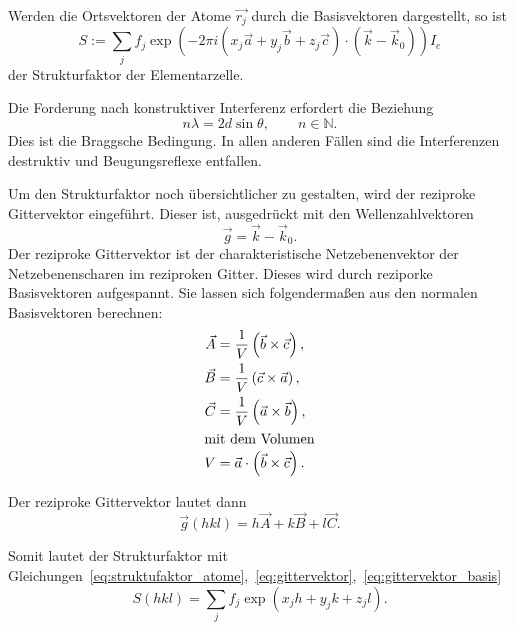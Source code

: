 Werden die Ortsvektoren der Atome $\vec{r_j}$ durch die Basisvektoren dargestellt, so ist
\begin{equation}
  \label{eq:struktufaktor_atome}
  S := \sum_j f_j \exp\left(-2\pi i \left(x_j \vec{a} + y_j \vec{b} + z_j \vec{c}\right) \cdot \left(\vec{k} - \vec{k}_0 \right)\right) I_e
\end{equation}
der Strukturfaktor der Elementarzelle.

Die Forderung nach konstruktiver Interferenz erfordert die Beziehung
\begin{equation}
  n \lambda = 2 d \sin{\theta}, \hspace{2em} n \in \mathbb{N}.
\end{equation}
Dies ist die Braggsche Bedingung.
In allen anderen Fällen sind die Interferenzen destruktiv und Beugungsreflexe entfallen.

Um den Strukturfaktor noch übersichtlicher zu gestalten, wird der reziproke Gittervektor eingeführt.
Dieser ist, ausgedrückt mit den Wellenzahlvektoren
\begin{equation}
  \label{eq:gittervektor}
  \vec{g} = \vec{k} - \vec{k}_0.
\end{equation}
Der reziproke Gittervektor ist der charakteristische Netzebenenvektor der Netzebenenscharen im reziproken Gitter.
Dieses wird durch reziporke Basisvektoren aufgespannt.
Sie lassen sich folgendermaßen aus den normalen Basisvektoren berechnen:
\begin{align}
  \label{eq:reziproke_basisvektoren}
  \vec{A} &= \frac{1}{V} \left(\vec{b} \times \vec{c}\right), \\
  \vec{B} &= \frac{1}{V} \left(\vec{c} \times \vec{a}\right), \\
  \vec{C} &= \frac{1}{V} \left(\vec{a} \times \vec{b}\right), \\
  \intertext{mit dem Volumen}
  V &= \vec{a} \cdot \left(\vec{b} \times \vec{c}\right).
\end{align}

Der reziproke Gittervektor lautet dann
\begin{equation}
  \label{eq:gittervektor_basis}
  \vec{g}(hkl) = h\vec{A} + k\vec{B} + l\vec{C}.
\end{equation}

Somit lautet der Strukturfaktor mit Gleichungen~\eqref{eq:struktufaktor_atome},~\eqref{eq:gittervektor},~\eqref{eq:gittervektor_basis}
\begin{equation}
  S\left(hkl\right) = \sum_j f_j \exp\left(x_j h + y_j k + z_j l\right).
\end{equation}

